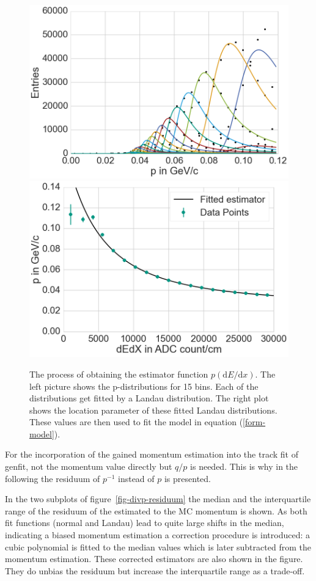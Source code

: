 \begin{figure}
  \centering
  \includegraphics[width=0.48\linewidth]{figures/vxd/fitLandau1.png}
  \includegraphics[width=0.48\linewidth]{figures/vxd/fitLandau2.png}
  \caption[The process of obtaining the estimator function $p(\mathrm d E/\mathrm d x)$.]{The process of obtaining the estimator function $p(\mathrm d E/\mathrm d x)$. The left picture shows the p-distributions for 15 \dedx bins. Each of the distributions get fitted by a Landau distribution. The right plot shows the location parameter of these fitted Landau distributions. These values are then used to fit the model in equation (\ref{form-model}).}
  \label{fig-fit-bins}
\end{figure}

For the incorporation of the gained momentum estimation into the track fit of genfit, not the momentum value directly but $q/p$ is needed. This is why in the following the residuum of $p^{-1}$ instead of $p$ is presented.

In the two subplots of figure~\ref{fig-divp-residuum} the median and the interquartile range of the residuum of the estimated to the MC momentum is shown. As both fit functions (normal and Landau) lead to quite large shifts in the median, indicating a biased momentum estimation a correction procedure is introduced: a cubic polynomial is fitted to the median values which is later subtracted from the momentum estimation. These corrected estimators are also shown in the figure. They do unbias the residuum but increase the interquartile range as a trade-off.

